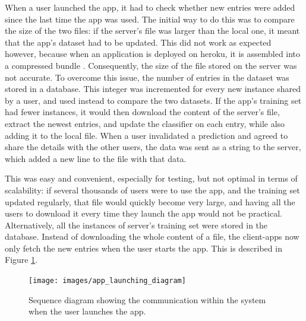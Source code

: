\documentclass{mproj}
\begin{document}
When a user launched the app, it had to check whether new entries were added since the last time the app was used. The initial way to do this was to compare the size of the two files: if the server's file was larger than the local one, it meant that the app's dataset had to be updated. This did not work as expected however, because when an application is deployed on heroku, it is assembled into a compressed bundle \cite{herokuslug}. Consequently, the size of the file stored on the server was not accurate. To overcome this issue, the number of entries in the dataset was stored in a database. This integer was incremented for every new instance shared by a user, and used instead to compare the two datasets. If the app's training set had fewer instances, it would then download the content of the server's file, extract the newest entries, and update the classifier on each entry, while also adding it to the local file. When a user invalidated a prediction and agreed to share the details with the other users, the data was sent as a string to the server, which added a new line to the file with that data.\par

This was easy and convenient, especially for testing, but not optimal in terms of scalability: if several thousands of users were to use the app, and the training set updated regularly, that file would quickly become very large, and having all the users to download it every time they launch the app would not be practical. Alternatively, all the instances of server's training set were stored in the database. Instead of downloading the whole content of a file, the client-apps now only fetch the new entries when the user starts the app. This is described in Figure \ref{fig:launch}.
\begin{figure}[h]
	\centering
	\texttt{[image: images/app\_launching\_diagram]}
	\caption{Sequence diagram showing the communication within the system when the user launches the app.}
	\label{fig:launch}
\end{figure}
\end{document}
